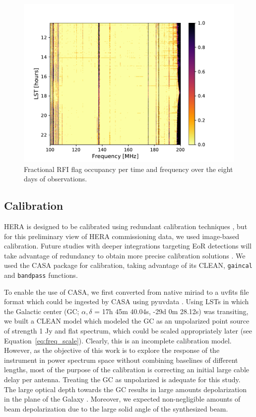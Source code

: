 \begin{figure}
\centering
\includegraphics[scale=0.6]{chapters/eor_window_HERA/figures/frac_occ.pdf}
\caption{Fractional RFI flag occupancy per time and frequency over the eight days of observations.}
\label{fig:hera19_rfi}
\end{figure}

\subsection{Calibration}
\label{subsec:hera19_cal}

HERA is designed to be calibrated using redundant calibration techniques \citep{Dillon.16}, but for this preliminary view of HERA commissioning data, we used image-based calibration. Future studies with deeper integrations targeting EoR detections will take advantage of redundancy to obtain more precise calibration solutions \citep{deBoer.17}. We used the {\sc CASA} \citep{casa} package for calibration, taking advantage of its CLEAN, {\tt gaincal} and {\tt bandpass} functions.

To enable the use of {\sc CASA}, we first converted from native {\sc miriad} to a {\sc uvfits} file format which could be ingested by {\sc CASA} using {\sc pyuvdata} \citep{pyuvdata}. 
Using LSTs in which the Galactic center (GC; $\alpha, \delta$ = 17h 45m 40.04s,​ ​-29d 0m 28.12s) was transiting, we built a CLEAN model which modeled the GC as an unpolarized point source of strength 1 Jy and flat spectrum, which could be scaled appropriately later (see Equation~\ref{eq:freq_scale}). 
Clearly, this is an incomplete calibration model. However, as the objective of this work is to explore the response of the instrument in power spectrum space without combining baselines of different lengths, most of the purpose of the calibration is correcting an initial large cable delay per antenna. 
Treating the GC as unpolarized is adequate for this study. The large optical depth towards the GC \citep{Oppermann.12} results in large amounts depolarization in the plane of the Galaxy \citep{Wolleben.06}. Moreover, we expected non-negligible amounts of beam depolarization due to the large solid angle of the synthesized beam.


